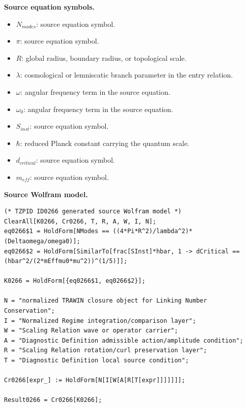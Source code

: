\begin{minipage}[t]{0.49\linewidth}
\begingroup
\small
\raggedright
\textbf{Source equation symbols.}\par
\begin{itemize}[leftmargin=1.35em,itemsep=1pt,topsep=1pt,parsep=0pt]
    \item $N_{modes}$: source equation symbol.
    \item $\pi$: source equation symbol.
    \item $R$: global radius, boundary radius, or topological scale.
    \item $\lambda$: cosmological or lemniscatic branch parameter in the entry relation.
    \item $\omega$: angular frequency term in the source equation.
    \item $\omega_0$: angular frequency term in the source equation.
    \item $S_{inst}$: source equation symbol.
    \item $\hbar$: reduced Planck constant carrying the quantum scale.
    \item $d_{critical}$: source equation symbol.
    \item $m_{eff}$: source equation symbol.
\end{itemize}
\endgroup
\end{minipage}\hfill
\begin{minipage}[t]{0.47\linewidth}
\begingroup
\scriptsize
\raggedright
\textbf{Source Wolfram model.}\par
\begin{Verbatim}[fontsize=\tiny,breaklines=true,breakanywhere=true]
(* TZPID ID0266 generated source Wolfram model *)
ClearAll[K0266, Cr0266, T, R, A, W, I, N];
eq0266$1 = HoldForm[NModes == ((4*Pi*R^2)/lambda^2)*(Deltaomega/omega0)];
eq0266$2 = HoldForm[SimilarTo[frac[SInst]*hbar, 1 -> dCritical == (hbar^2/(2*mEffmu0*mu^2))^(1/5)]];

K0266 = HoldForm[{eq0266$1, eq0266$2}];

N = "normalized TRAWIN closure object for Linking Number Conservation";
I = "Normalized Regime integration/comparison layer";
W = "Scaling Relation wave or operator carrier";
A = "Diagnostic Definition admissible action/amplitude condition";
R = "Scaling Relation rotation/curl preservation layer";
T = "Diagnostic Definition local source condition";

Cr0266[expr_] := HoldForm[N[I[W[A[R[T[expr]]]]]]];

Result0266 = Cr0266[K0266];
\end{Verbatim}
\endgroup
\end{minipage}

